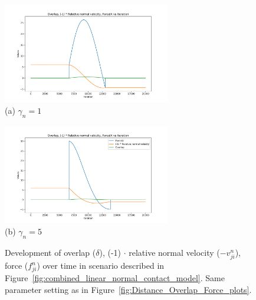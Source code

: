 \documentclass[11pt,
               a4paper,
               bibtotoc,
               idxtotoc,
               headsepline,
               footsepline,
               footexclude,
               BCOR12mm,
               DIV13,
               openany,   %
               ]
               {scrbook}
\begin{document}
\begin{figure}[H]
	\centering
	\begin{center}
		\includegraphics[width=0.65\textwidth]{figures/contactForceLaws/linearNormalContactModel/Overlap, Relative normal velocity vs Iteration simple_collision_two_particles_statistics_stiffness_50_viscosity_1e-2viscosity_1.png}
		\\ (a) $\gamma_n = 1$ %
	\end{center}
	
	\begin{center}
		\includegraphics[width=0.65\textwidth]{figures/contactForceLaws/linearNormalContactModel/Overlap, Relative normal velocity vs Iteration simple_collision_two_particles_statistics_stiffness_50_viscosity_1e-2viscosity_5.png}
		\\ (b) $\gamma_n = 5$
	\end{center}
	
	\caption[Combined Caption]{Development of overlap ($\delta$), (-1) $\cdot$ relative normal velocity ($-v^n_{ji}$), force ($f^n_{ji}$) over time in scenario described in Figure~\ref{fig:combined_linear_normal_contact_model}.  Same parameter setting as in Figure~\ref{fig:Distance_Overlap_Force_plots}.}
	\label{fig:Relative_Normal_Velocity_plots}
\end{figure}
\end{document}
